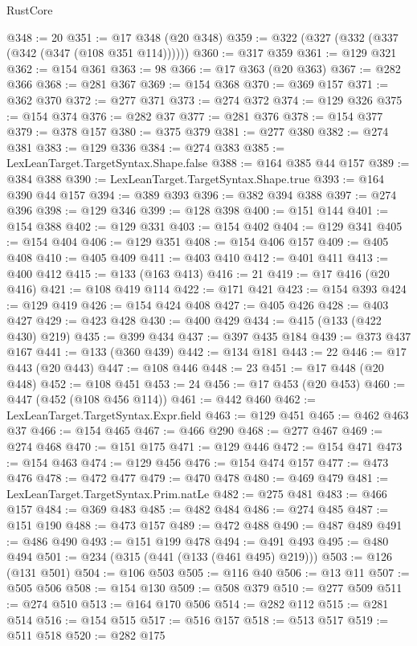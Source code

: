 \begin{lexlean}{RustCore}
\begin{coremodule}
@348 := 20
@351 := @17 @348 (@20 @348)
@359 := @322 (@327 (@332 (@337 (@342 (@347 (@108 @351 @114))))))
@360 := @317 @359
@361 := @129 @321
@362 := @154 @361
@363 := 98
@366 := @17 @363 (@20 @363)
@367 := @282 @366
@368 := @281 @367
@369 := @154 @368
@370 := @369 @157
@371 := @362 @370
@372 := @277 @371
@373 := @274 @372
@374 := @129 @326
@375 := @154 @374
@376 := @282 @37
@377 := @281 @376
@378 := @154 @377
@379 := @378 @157
@380 := @375 @379
@381 := @277 @380
@382 := @274 @381
@383 := @129 @336
@384 := @274 @383
@385 := LexLeanTarget.TargetSyntax.Shape.false
@388 := @164 @385 @44 @157
@389 := @384 @388
@390 := LexLeanTarget.TargetSyntax.Shape.true
@393 := @164 @390 @44 @157
@394 := @389 @393
@396 := @382 @394 @388
@397 := @274 @396
@398 := @129 @346
@399 := @128 @398
@400 := @151 @144
@401 := @154 @388
@402 := @129 @331
@403 := @154 @402
@404 := @129 @341
@405 := @154 @404
@406 := @129 @351
@408 := @154 @406 @157
@409 := @405 @408
@410 := @405 @409
@411 := @403 @410
@412 := @401 @411
@413 := @400 @412
@415 := @133 (@163 @413)
@416 := 21
@419 := @17 @416 (@20 @416)
@421 := @108 @419 @114
@422 := @171 @421
@423 := @154 @393
@424 := @129 @419
@426 := @154 @424 @408
@427 := @405 @426
@428 := @403 @427
@429 := @423 @428
@430 := @400 @429
@434 := @415 (@133 (@422 @430) @219)
@435 := @399 @434
@437 := @397 @435 @184
@439 := @373 @437 @167
@441 := @133 (@360 @439)
@442 := @134 @181
@443 := 22
@446 := @17 @443 (@20 @443)
@447 := @108 @446
@448 := 23
@451 := @17 @448 (@20 @448)
@452 := @108 @451
@453 := 24
@456 := @17 @453 (@20 @453)
@460 := @447 (@452 (@108 @456 @114))
@461 := @442 @460
@462 := LexLeanTarget.TargetSyntax.Expr.field
@463 := @129 @451
@465 := @462 @463 @37
@466 := @154 @465
@467 := @466 @290
@468 := @277 @467
@469 := @274 @468
@470 := @151 @175
@471 := @129 @446
@472 := @154 @471
@473 := @154 @463
@474 := @129 @456
@476 := @154 @474 @157
@477 := @473 @476
@478 := @472 @477
@479 := @470 @478
@480 := @469 @479
@481 := LexLeanTarget.TargetSyntax.Prim.natLe
@482 := @275 @481
@483 := @466 @157
@484 := @369 @483
@485 := @482 @484
@486 := @274 @485
@487 := @151 @190
@488 := @473 @157
@489 := @472 @488
@490 := @487 @489
@491 := @486 @490
@493 := @151 @199 @478
@494 := @491 @493
@495 := @480 @494
@501 := @234 (@315 (@441 (@133 (@461 @495) @219)))
@503 := @126 (@131 @501)
@504 := @106 @503
@505 := @116 @40
@506 := @13 @11
@507 := @505 @506
@508 := @154 @130
@509 := @508 @379
@510 := @277 @509
@511 := @274 @510
@513 := @164 @170 @506
@514 := @282 @112
@515 := @281 @514
@516 := @154 @515
@517 := @516 @157
@518 := @513 @517
@519 := @511 @518
@520 := @282 @175

\end{coremodule}
\end{lexlean}
